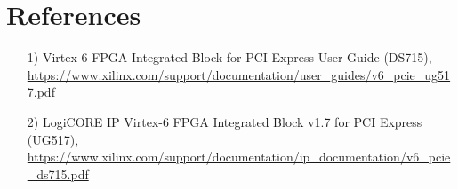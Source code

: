 \documentclass{article}
\begin{document}
\section*{References}
\begin{flushleft}
	\begin{itemize}
		\item[1)] Virtex-6 FPGA Integrated Block for PCI Express User Guide (DS715), \url{https://www.xilinx.com/support/documentation/user_guides/v6_pcie_ug517.pdf} \\
		\item[2)] LogiCORE IP Virtex-6 FPGA Integrated Block v1.7 for PCI Express (UG517), \url{https://www.xilinx.com/support/documentation/ip_documentation/v6_pcie_ds715.pdf}
	\end{itemize}
\end{flushleft}
\end{document}
